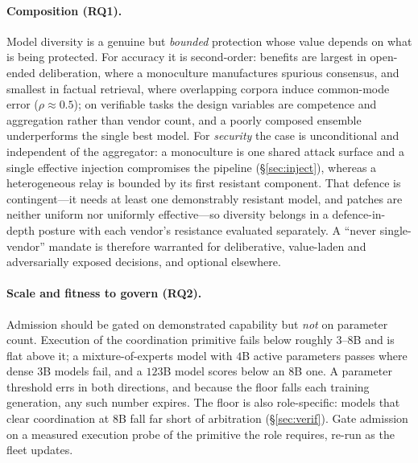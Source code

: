 \documentclass[manuscript,screen,review]{acmart}
\begin{document}
\paragraph{Composition (RQ1).} Model diversity is a genuine but \emph{bounded}
protection whose value depends on what is being protected. For accuracy it is
second-order: benefits are largest in open-ended deliberation, where a monoculture
manufactures spurious consensus, and smallest in factual retrieval, where
overlapping corpora induce common-mode error ($\rho\approx0.5$); on verifiable
tasks the design variables are competence and aggregation rather than vendor count,
and a poorly composed ensemble underperforms the single best model. For
\emph{security} the case is unconditional and independent of the aggregator: a
monoculture is one shared attack surface and a single effective injection
compromises the pipeline (\S\ref{sec:inject}), whereas a heterogeneous relay is
bounded by its first resistant component. That defence is contingent---it needs at
least one demonstrably resistant model, and patches are neither uniform nor
uniformly effective---so diversity belongs in a defence-in-depth posture with each
vendor's resistance evaluated separately. A ``never single-vendor'' mandate is
therefore warranted for deliberative, value-laden and adversarially exposed
decisions, and optional elsewhere.

\paragraph{Scale and fitness to govern (RQ2).} Admission should be gated on
demonstrated capability but \emph{not} on parameter count. Execution of the
coordination primitive fails below roughly $3$--$8$B and is flat above it; a
mixture-of-experts model with $4$B active parameters passes where dense $3$B models
fail, and a $123$B model scores below an $8$B one. A parameter threshold errs in
both directions, and because the floor falls each training generation, any such
number expires. The floor is also role-specific: models that clear coordination at
$8$B fall far short of arbitration (\S\ref{sec:verif}). Gate admission on a measured
execution probe of the primitive the role requires, re-run as the fleet updates.
\end{document}

